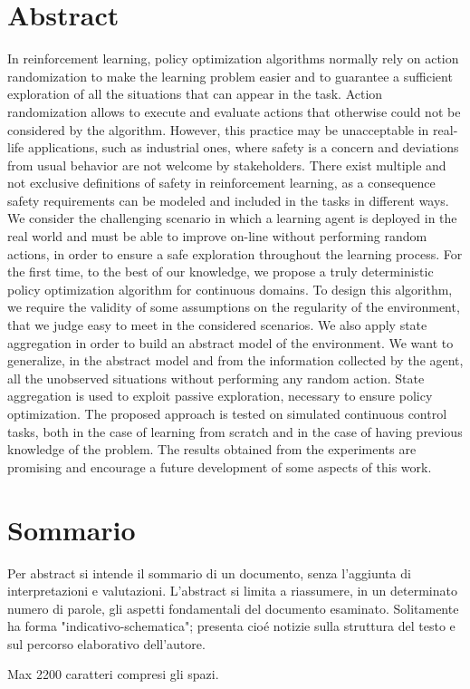 
\begingroup
\let\clearpage\relax
\let\cleardoublepage\relax
\let\cleardoublepage\relax

\chapter*{Abstract}
In reinforcement learning, policy optimization algorithms normally rely on action randomization to make the learning problem easier and to guarantee a sufficient exploration of all the situations that can appear in the task. Action randomization allows to execute and evaluate actions that otherwise could not be considered by the algorithm. However, this practice may be unacceptable in real-life applications, such as industrial ones, where safety is a concern and deviations from usual behavior are not welcome by stakeholders. There exist multiple and not exclusive definitions of safety in reinforcement learning, as a consequence safety requirements can be modeled and included in the tasks in different ways. We consider the challenging scenario in which a learning agent is deployed in the real world and must be able to improve on-line without performing random actions, in order to ensure a safe exploration throughout the learning process. For the first time, to the best of our knowledge, we propose a truly deterministic policy optimization algorithm for continuous domains. To design this algorithm, we require the validity of some assumptions on the regularity of the environment, that we judge easy to meet in the considered scenarios. We also apply state aggregation in order to build an abstract model of the environment. We want to generalize, in the abstract model and from the information collected by the agent, all the unobserved situations without performing any random action. State aggregation is used to exploit passive exploration, necessary to ensure policy optimization. The proposed approach is tested on simulated continuous control tasks, both in the case of learning from scratch and in the case of having previous knowledge of the problem. The results obtained from the experiments are promising and encourage a future development of some aspects of this work.

\vfill
\newpage
{}
\chapter*{Sommario}
Per abstract si intende il sommario di un documento, senza l'aggiunta di interpretazioni e valutazioni. L'abstract si limita a riassumere, in un determinato numero di parole, gli aspetti fondamentali del documento esaminato. Solitamente ha forma "indicativo-schematica"; presenta cioé notizie sulla struttura del testo e sul percorso elaborativo dell'autore.

Max 2200 caratteri compresi gli spazi.

\endgroup